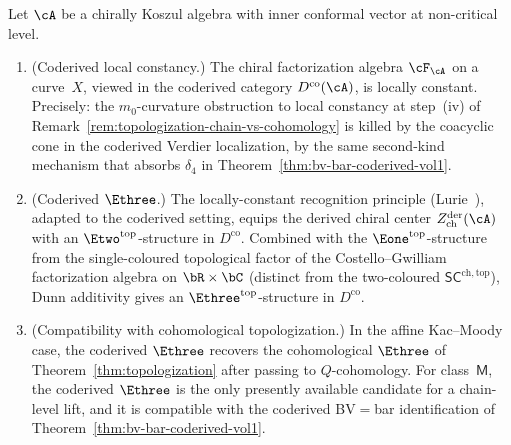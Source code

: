 \begin{conjecture}
\label{conj:coderived-e3}%
%
%
%
Let $\cA$ be a chirally Koszul algebra with inner conformal vector
at non-critical level.
\begin{enumerate}[label=\textup{(\roman*)}]
\item \textup{(Coderived local constancy.)}
 The chiral factorization algebra $\cF_\cA$ on a curve~$X$,
 viewed in the coderived category $D^{\mathrm{co}}(\cA)$,
 is locally constant. Precisely: the
 $m_0$-curvature obstruction to local constancy at
 step~\textup{(iv)} of
 Remark~\textup{\ref{rem:topologization-chain-vs-cohomology}}
 is killed by the coacyclic cone in the coderived Verdier
 localization, by the same second-kind mechanism that absorbs
 $\delta_4$ in
 Theorem~\textup{\ref{thm:bv-bar-coderived-vol1}}.
\item \textup{(Coderived $\Ethree$.)}
 The locally-constant recognition principle
 \textup{(}Lurie~\cite{HA}\textup{)}, adapted to the
 coderived setting, equips the derived chiral center
 $Z^{\mathrm{der}}_{\mathrm{ch}}(\cA)$ with an
 $\Etwo^{\mathrm{top}}$-structure in $D^{\mathrm{co}}$.
 Combined with the $\Eone^{\mathrm{top}}$-structure from
 the single-coloured topological factor of the
 Costello--Gwilliam factorization algebra on
 $\bR \times \bC$ (distinct from the two-coloured
 $\mathsf{SC}^{\mathrm{ch,top}}$), Dunn additivity gives an
 $\Ethree^{\mathrm{top}}$-structure in $D^{\mathrm{co}}$.
\item \textup{(Compatibility with cohomological topologization.)}
 In the affine Kac--Moody case, the coderived $\Ethree$
 recovers the cohomological $\Ethree$ of
 Theorem~\textup{\ref{thm:topologization}} after passing
 to $Q$-cohomology. For class~$\mathsf{M}$, the coderived
 $\Ethree$ is the only presently available candidate for a
 chain-level lift, and it is compatible with the coderived
 BV$=$bar identification of
 Theorem~\textup{\ref{thm:bv-bar-coderived-vol1}}.
\end{enumerate}
\end{conjecture}

